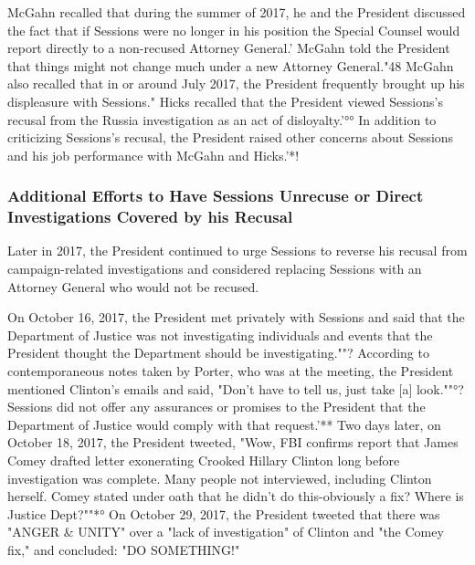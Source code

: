 McGahn recalled that during the summer of 2017, he and the President discussed the fact that if Sessions were no longer in his position the Special Counsel would report directly to a non-recused Attorney General.'
McGahn told the President that things might not change much under a new Attorney General."48
McGahn also recalled that in or around July 2017, the President frequently brought up his displeasure with Sessions."
Hicks recalled that the President viewed Sessions's recusal from the Russia investigation as an act of disloyalty.'°°
In addition to criticizing Sessions's recusal, the President raised other concerns about Sessions and his job performance with McGahn and Hicks.'*!

\subsubsection{Additional Efforts to Have Sessions Unrecuse or Direct Investigations Covered by his Recusal}

Later in 2017, the President continued to urge Sessions to reverse his recusal from campaign-related investigations and considered replacing Sessions with an Attorney General who would not be recused.

On October 16, 2017, the President met privately with Sessions and said that the Department of Justice was not investigating individuals and events that the President thought the Department should be investigating.""?
According to contemporaneous notes taken by Porter, who was at the meeting, the President mentioned Clinton's emails and said, "Don't have to tell us, just take [a] look.""°?
Sessions did not offer any assurances or promises to the President that the Department of Justice would comply with that request.'**
Two days later, on October 18, 2017, the President tweeted, "Wow, FBI confirms report that James Comey drafted letter exonerating Crooked Hillary Clinton long before investigation was complete.
Many people not interviewed, including Clinton herself.
Comey stated under oath that he didn't do this-obviously a fix? Where is Justice Dept?""*°
On October 29, 2017, the President tweeted that there was "ANGER \& UNITY" over a "lack of investigation" of Clinton and "the Comey fix," and concluded: "DO SOMETHING!"


